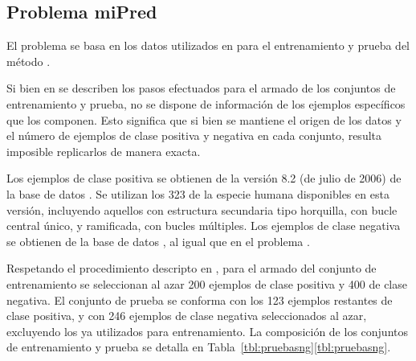 %
%
\subsection{Problema miPred}
%
El problema \mipred{} se basa en los datos utilizados en \cite{ng}
para el entrenamiento y prueba del método \work\mipred.

Si bien en \cite{ng} se describen los pasos efectuados para el armado
de los conjuntos de entrenamiento y prueba, no se dispone de
información de los ejemplos específicos que los componen.
Esto significa que si bien se mantiene el origen de los datos y el
número de ejemplos de clase positiva y negativa en cada conjunto,
resulta imposible replicarlos de manera exacta.

Los ejemplos de clase positiva se obtienen de la versión 8.2 (de julio
de 2006) de la base de datos \work{\mirbase}.
Se utilizan los 323  de la especie humana disponibles en
esta versión, incluyendo aquellos con estructura secundaria tipo
horquilla, con bucle central único, y ramificada, con bucles
múltiples.
Los ejemplos de clase negativa se obtienen de la base de datos
, al igual que en el problema \prob\tripletsvm.

Respetando el procedimiento descripto en \cite{ng}, para el armado del
conjunto de entrenamiento  se seleccionan al azar 200
ejemplos de clase positiva y 400 de clase negativa.
El conjunto de prueba  se conforma con los 123 ejemplos
restantes de clase positiva, y con 246 ejemplos de clase negativa
seleccionados al azar, excluyendo los ya utilizados para
entrenamiento.
La composición de los conjuntos de entrenamiento y prueba se detalla
en \iflatexml{}Tabla~\ref{tbl:pruebasng}\else\autoref{tbl:pruebasng}\fi.
